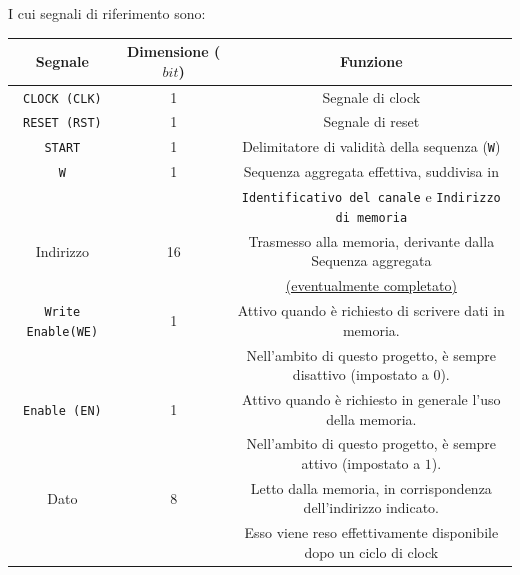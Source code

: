 \documentclass[a4paper,11pt]{article} %
\begin{document}
    I cui segnali di riferimento sono:

    \medskip

    \begin{tabular}{|c|c|c|}
        \hline
        Segnale                   & Dimensione ($bit$) & Funzione                                                                  \\
        \hline
        \texttt{CLOCK (CLK)}      & 1                  & Segnale di clock                                                          \\
        \hline
        \texttt{RESET (RST)}      & 1                  & Segnale di reset                                                          \\
        \hline
        \texttt{START}            & 1                  & Delimitatore di validità della sequenza (\texttt{W})                      \\
        \hline
        \texttt{W}                & 1                  & Sequenza aggregata effettiva, suddivisa in                                \\
        &                    & \texttt{Identificativo del canale} e \texttt{Indirizzo di memoria}        \\
        \hline
        Indirizzo                 & 16                 & Trasmesso alla memoria, derivante dalla Sequenza aggregata                \\
        &                    & \hyperref[subsec:descrizione-ad-alto-livello]{(eventualmente completato)} \\
        \hline
        \texttt{Write Enable(WE)} & 1                  & Attivo quando è richiesto di scrivere dati in memoria.                    \\
        &                    & Nell'ambito di questo progetto, è sempre disattivo (impostato a $0$).     \\
        \hline
        \texttt{Enable (EN)}      & 1                  & Attivo quando è richiesto in generale l'uso della memoria.                \\
        &                    & Nell'ambito di questo progetto, è sempre attivo (impostato a $1$).        \\
        \hline
        Dato                      & 8                  & Letto dalla memoria, in corrispondenza dell'indirizzo indicato.           \\
        &                    & Esso viene reso effettivamente disponibile dopo un ciclo di clock         \\

\end{tabular}
\end{document}
